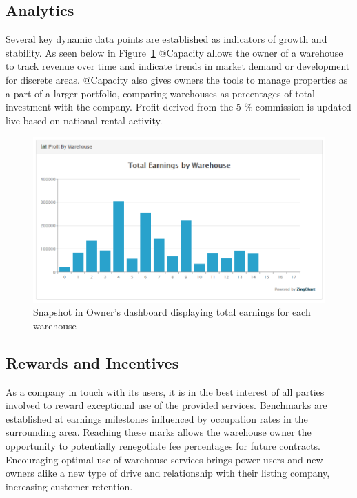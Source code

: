 \subsection{Analytics}
Several key dynamic data points are established as indicators of growth and stability. As seen below in Figure~\ref{fig:ownergraph} @Capacity allows the owner of a warehouse to track revenue over time and indicate trends in market demand or development for discrete areas. @Capacity also gives owners the tools to manage properties as a part of a larger portfolio, comparing warehouses as percentages of total investment with the company. Profit derived from the 5 \% commission is updated live based on national rental activity.
\begin{figure}[H]
\centering
\includegraphics[width=1\textwidth]{Phase_3/earninggraph}
\caption{Snapshot in Owner's dashboard displaying total earnings for each warehouse}
\label{fig:ownergraph}
\end{figure}

\subsection{Rewards and Incentives}
As a company in touch with its users, it is in the best interest of all parties involved to reward exceptional use of the provided services. Benchmarks are established at earnings milestones influenced by occupation rates in the surrounding area. Reaching these marks allows the warehouse owner the opportunity to potentially renegotiate fee percentages for future contracts. Encouraging optimal use of warehouse services brings power users and new owners alike a new type of drive and relationship with their listing company, increasing customer retention. 



